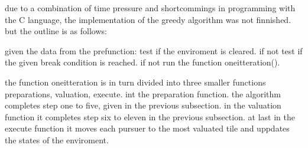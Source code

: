 due to a combination of time pressure and shortcommings in programming with the C language, the implementation of the greedy algorithm was not finnished. but the outline is as follows:

given the data from the prefunction:
test if the enviroment is cleared. if not
test if the given break condition is reached. if not
run the function oneitteration().
 
the function oneitteration is in turn divided into three smaller functions preparations, valuation, execute.
int the preparation function. the algorithm  completes step one to five, given in the previous subsection.
in the valuation function it completes step six to eleven in the previous subsection.
at last in the execute function it moves each pursuer to the most valuated tile and uppdates the states of the enviroment.


